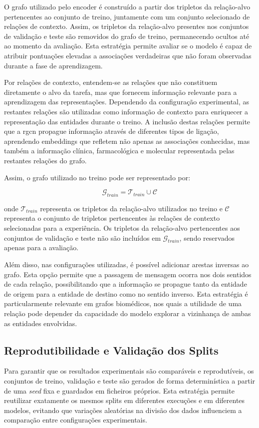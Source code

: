 O grafo utilizado pelo encoder é construído a partir dos tripletos da relação-alvo pertencentes ao conjunto de treino, juntamente com um conjunto selecionado de relações de contexto. Assim, os tripletos da relação-alvo presentes nos conjuntos de validação e teste são removidos do grafo de treino, permanecendo ocultos até ao momento da avaliação. Esta estratégia permite avaliar se o modelo é capaz de atribuir pontuações elevadas a associações verdadeiras que não foram observadas durante a fase de aprendizagem.

Por relações de contexto, entendem-se as relações que não constituem diretamente o alvo da tarefa, mas que fornecem informação relevante para a aprendizagem das representações. Dependendo da configuração experimental, as restantes relações são utilizadas como informação de contexto para enriquecer a representação das entidades durante o treino. A inclusão destas relações permite que a \acrshort{rgcn} propague informação através de diferentes tipos de ligação, aprendendo embeddings que refletem não apenas as associações conhecidas, mas também a informação clínica, farmacológica e molecular representada pelas restantes relações do grafo.

Assim, o grafo utilizado no treino pode ser representado por:

\[\mathcal{G}_{train}=\mathcal{T}_{train}\cup\mathcal{C}\]

onde \(\mathcal{T}_{train}\) representa os tripletos da relação-alvo utilizados no treino e \(\mathcal{C}\) representa o conjunto de tripletos pertencentes às relações de contexto selecionadas para a experiência. Os tripletos da relação-alvo pertencentes aos conjuntos de validação e teste não são incluídos em \(\mathcal{G}_{train}\), sendo reservados apenas para a avaliação.

Além disso, nas configurações utilizadas, é possível adicionar arestas inversas ao grafo. Esta opção permite que a passagem de mensagem ocorra nos dois sentidos de cada relação, possibilitando que a informação se propague tanto da entidade de origem para a entidade de destino como no sentido inverso. Esta estratégia é particularmente relevante em grafos biomédicos, nos quais a utilidade de uma relação pode depender da capacidade do modelo explorar a vizinhança de ambas as entidades envolvidas.

\subsection{Reprodutibilidade e Validação dos Splits}
\label{subsec:reprodutibilidade-splits}
Para garantir que os resultados experimentais são comparáveis e reprodutíveis, os conjuntos de treino, validação e teste são gerados de forma determinística a partir de uma \emph{seed} fixa e guardados em ficheiros próprios. Esta estratégia permite reutilizar exatamente os mesmos splits em diferentes execuções e em diferentes modelos, evitando que variações aleatórias na divisão dos dados influenciem a comparação entre configurações experimentais.

